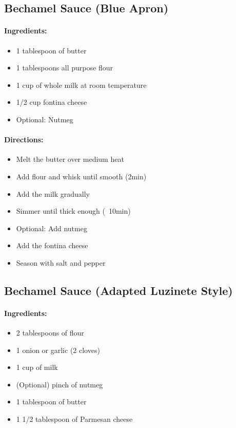 \documentclass{article}
\begin{document}
\subsection{Bechamel Sauce (Blue Apron)}

\paragraph{Ingredients:}
\begin{itemize}
    \item 1 tablespoon of butter
    \item 1 tablespoons all purpose flour
    \item 1 cup of whole milk at room temperature
    \item 1/2 cup fontina cheese
    \item Optional: Nutmeg
\end{itemize}

\paragraph{Directions:}
\begin{itemize}
    \item Melt the butter over medium heat
    \item Add flour and whisk until smooth (2min)
    \item Add the milk gradually
    \item Simmer until thick enough (~10min)
    \item Optional: Add nutmeg
    \item Add the fontina cheese
    \item Season with salt and pepper
\end{itemize}

\subsection{Bechamel Sauce (Adapted Luzinete Style)}

\paragraph{Ingredients:}
\begin{itemize}
    \item 2 tablespoons of flour
    \item 1 onion or garlic (2 cloves)
    \item 1 cup of milk
    \item (Optional) pinch of nutmeg
    \item 1 tablespoon of butter
    \item 1 1/2 tablespoon of Parmesan cheese
\end{itemize}
\end{document}
